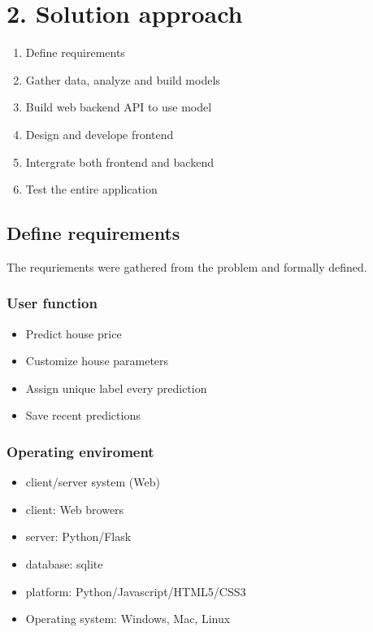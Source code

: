 \section{2. Solution approach}\label{solution-approach}

\begin{enumerate}
\def\labelenumi{\arabic{enumi})}
\itemsep1pt\parskip0pt
\item
  Define requirements
\item
  Gather data, analyze and build models
\item
  Build web backend API to use model
\item
  Design and develope frontend
\item
  Intergrate both frontend and backend
\item
  Test the entire application
\end{enumerate}

\subsection{Define requirements}\label{define-requirements}

The requriements were gathered from the problem and formally defined.

\subsubsection{User function}\label{user-function}

\begin{itemize}
\itemsep1pt\parskip0pt
\item
  Predict house price
\item
  Customize house parameters
\item
  Assign unique label every prediction
\item
  Save recent predictions
\end{itemize}

\subsubsection{Operating enviroment}\label{operating-enviroment}

\begin{itemize}
\itemsep1pt\parskip0pt
\item
  client/server system (Web)
\item
  client: Web browers
\item
  server: Python/Flask
\item
  database: sqlite
\item
  platform: Python/Javascript/HTML5/CSS3
\item
  Operating system: Windows, Mac, Linux
\end{itemize}


